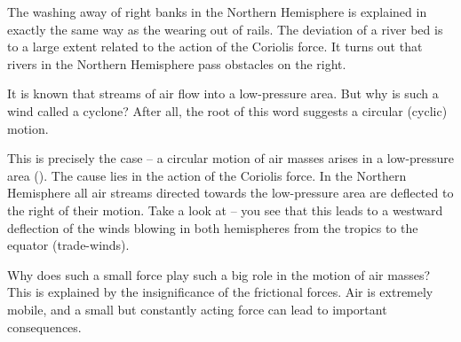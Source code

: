 The washing away of right banks in the Northern
Hemisphere is explained in exactly the same way as the
wearing out of rails. The deviation of a river bed is to
a large extent related to the action of the Coriolis force.
It turns out that rivers in the Northern Hemisphere pass
obstacles on the right.

It is known that streams of air flow into a low-pressure
area. But why is such a wind called a cyclone? After all,
the root of this word suggests a circular (cyclic) motion.

This is precisely the case -- a circular motion of air
masses arises in a low-pressure area (). The
cause lies in the action of the Coriolis force. In the Northern Hemisphere all air streams directed towards the low-pressure area are deflected to the right of their motion. Take a look at  -- you see that this leads to a westward deflection of the winds blowing in both hemispheres from the tropics to the equator (trade-winds). 

Why does such a small force play such a big role in the motion of air masses? This is explained by the insignificance of the frictional forces. Air is extremely mobile,
and a small but constantly acting force can lead to important consequences.
